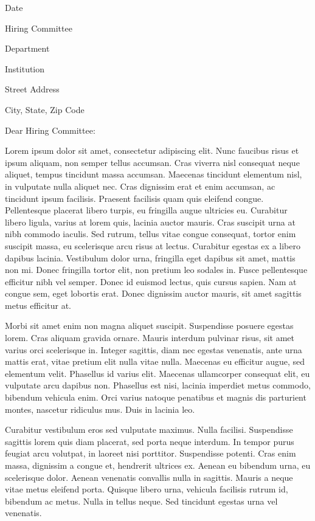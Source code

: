 \documentclass[12pt]{article}
\begin{document}
\setlength{\parindent}{0pt}
\setlength{\headsep}{0.6in}

Date
\bigskip

Hiring Committee

Department

Institution

Street Address

City, State, Zip Code
\bigskip

Dear Hiring Committee: \bigskip 

Lorem ipsum dolor sit amet, consectetur adipiscing elit. Nunc faucibus risus et
ipsum aliquam, non semper tellus accumsan. Cras viverra nisl consequat neque
aliquet, tempus tincidunt massa accumsan. Maecenas tincidunt elementum nisl, in
vulputate nulla aliquet nec. Cras dignissim erat et enim accumsan, ac tincidunt
ipsum facilisis. Praesent facilisis quam quis eleifend congue. Pellentesque
placerat libero turpis, eu fringilla augue ultricies eu. Curabitur libero
ligula, varius at lorem quis, lacinia auctor mauris. Cras suscipit urna at nibh
commodo iaculis. Sed rutrum, tellus vitae congue consequat, tortor enim suscipit
massa, eu scelerisque arcu risus at lectus. Curabitur egestas ex a libero
dapibus lacinia. Vestibulum dolor urna, fringilla eget dapibus sit amet, mattis
non mi. Donec fringilla tortor elit, non pretium leo sodales in. Fusce
pellentesque efficitur nibh vel semper. Donec id euismod lectus, quis cursus
sapien. Nam at congue sem, eget lobortis erat. Donec dignissim auctor mauris,
sit amet sagittis metus efficitur at. \bigskip 

Morbi sit amet enim non magna aliquet suscipit. Suspendisse posuere egestas
lorem. Cras aliquam gravida ornare. Mauris interdum pulvinar risus, sit amet
varius orci scelerisque in. Integer sagittis, diam nec egestas venenatis, ante
urna mattis erat, vitae pretium elit nulla vitae nulla. Maecenas eu efficitur
augue, sed elementum velit. Phasellus id varius elit. Maecenas ullamcorper
consequat elit, eu vulputate arcu dapibus non. Phasellus est nisi, lacinia
imperdiet metus commodo, bibendum vehicula enim. Orci varius natoque penatibus
et magnis dis parturient montes, nascetur ridiculus mus. Duis in lacinia
leo. \bigskip 

Curabitur vestibulum eros sed vulputate maximus. Nulla facilisi. Suspendisse sagittis lorem quis diam placerat, sed porta neque interdum. In tempor purus feugiat arcu volutpat, in laoreet nisi porttitor. Suspendisse potenti. Cras enim massa, dignissim a congue et, hendrerit ultrices ex. Aenean eu bibendum urna, eu scelerisque dolor. Aenean venenatis convallis nulla in sagittis. Mauris a neque vitae metus eleifend porta. Quisque libero urna, vehicula facilisis rutrum id, bibendum ac metus. Nulla in tellus neque. Sed tincidunt egestas urna vel venenatis.
\end{document}
